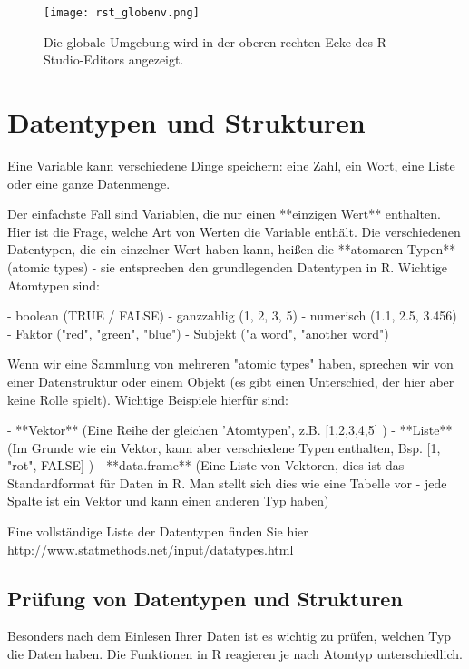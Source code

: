 \documentclass[a4paper,twoside]{tufte-book}\usepackage[]{graphicx}\usepackage[]{color}
\begin{document}
\begin{appendices}
\begin{figure}[]
\begin{center}
\texttt{[image: rst\_globenv.png]}
\caption{Die globale Umgebung wird in der oberen rechten Ecke des R Studio-Editors angezeigt.}
\label{fig: Rstudio}
\end{center}
\end{figure}

\section{Datentypen und Strukturen}

Eine Variable kann verschiedene Dinge speichern: eine Zahl, ein Wort, eine Liste oder eine ganze Datenmenge.

Der einfachste Fall sind Variablen, die nur einen **einzigen Wert** enthalten. Hier ist die Frage, welche Art von Werten die Variable enthält. Die verschiedenen Datentypen, die ein einzelner Wert haben kann, heißen die **atomaren Typen** (atomic types) - sie entsprechen den grundlegenden Datentypen in R. Wichtige Atomtypen sind:

- boolean (TRUE / FALSE)
- ganzzahlig (1, 2, 3, 5)
- numerisch (1.1, 2.5, 3.456)
- Faktor ("red", "green", "blue")
- Subjekt ("a word", "another word")

Wenn wir eine Sammlung von mehreren "atomic types" haben, sprechen wir von einer Datenstruktur oder einem Objekt (es gibt einen Unterschied, der hier aber keine Rolle spielt). Wichtige Beispiele hierfür sind:

- **Vektor** (Eine Reihe der gleichen 'Atomtypen', z.B. [1,2,3,4,5] )
- **Liste** (Im Grunde wie ein Vektor, kann aber verschiedene Typen enthalten, Bsp. [1, "rot", FALSE] )
- **data.frame** (Eine Liste von Vektoren, dies ist das Standardformat für Daten in R. Man stellt sich dies wie eine Tabelle vor - jede Spalte ist ein Vektor und kann einen anderen Typ haben)

Eine vollständige Liste der Datentypen finden Sie hier http://www.statmethods.net/input/datatypes.html 
 
\subsection{Prüfung von Datentypen und Strukturen}

Besonders nach dem Einlesen Ihrer Daten ist es wichtig zu prüfen, welchen Typ die Daten haben. Die Funktionen in R reagieren je nach Atomtyp unterschiedlich.


\end{appendices}
\end{document}
